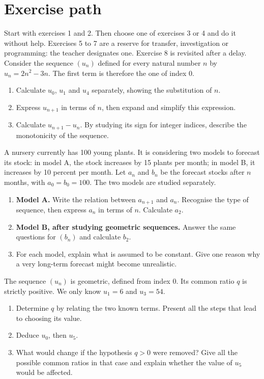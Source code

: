 \section*{Exercise path}\label{C01-PARC}
Start with exercises 1 and 2. Then choose one of exercises 3 or 4 and do it without help. Exercises 5 to 7 are a reserve for transfer, investigation or programming: the teacher designates one. Exercise 8 is revisited after a delay.
\begingroup
{}
Consider the sequence $(u_n)$ defined for every natural number $n$ by $u_n=2n^2-3n$. The first term is therefore the one of index 0.
\begin{enumerate}[label=\arabic*.]
\item Calculate $u_0$, $u_1$ and $u_4$ separately, showing the substitution of $n$.
\item Express $u_{n+1}$ in terms of $n$, then expand and simplify this expression.
\item Calculate $u_{n+1}-u_n$. By studying its sign for integer indices, describe the monotonicity of the sequence.
\end{enumerate}
A nursery currently has 100 young plants. It is considering two models to forecast its stock: in model A, the stock increases by 15 plants per month; in model B, it increases by 10 percent per month. Let $a_n$ and $b_n$ be the forecast stocks after $n$ months, with $a_0=b_0=100$. The two models are studied separately.
\begin{enumerate}[label=\arabic*.]
\item \textbf{Model A.} Write the relation between $a_{n+1}$ and $a_n$. Recognise the type of sequence, then express $a_n$ in terms of $n$. Calculate $a_2$.
\item \textbf{Model B, after studying geometric sequences.} Answer the same questions for $(b_n)$ and calculate $b_2$.
\item For each model, explain what is assumed to be constant. Give one reason why a very long-term forecast might become unrealistic.
\end{enumerate}
The sequence $(u_n)$ is geometric, defined from index 0. Its common ratio $q$ is strictly positive. We only know $u_1=6$ and $u_3=54$.
\begin{enumerate}[label=\arabic*.]
\item Determine $q$ by relating the two known terms. Present all the steps that lead to choosing its value.
\item Deduce $u_0$, then $u_5$.
\item What would change if the hypothesis $q>0$ were removed? Give all the possible common ratios in that case and explain whether the value of $u_5$ would be affected.
\end{enumerate}
